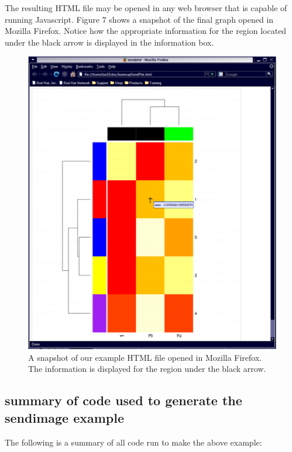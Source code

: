 \documentclass[]{article}
\begin{document}
The resulting HTML file may be opened in any web browser that is capable of running Javascript. Figure 7 shows a snapshot of the final graph opened in Mozilla Firefox. Notice how the appropriate information for the region located under the black arrow is displayed in the information box.
\begin{center}
\begin{figure}
\includegraphics{heatmapFirefox}
\caption{A snapshot of our example HTML file opened in Mozilla Firefox. The information is displayed for the region under the black arrow.}
\end{figure}
\end{center}

\subsection{summary of code used to generate the sendimage example}

The following is a summary of all code run to make the above example:
\end{document}
